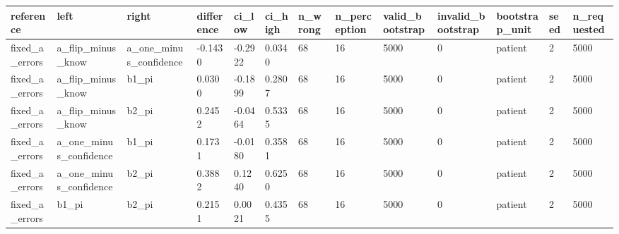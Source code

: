 \begin{tabular}{lllllllllllll}
\hline
reference & left & right & difference & ci\_low & ci\_high & n\_wrong & n\_perception & valid\_bootstrap & invalid\_bootstrap & bootstrap\_unit & seed & n\_requested \\
\hline
fixed\_a\_errors & a\_flip\_minus\_know & a\_one\_minus\_confidence & -0.1430 & -0.2922 & 0.0340 & 68 & 16 & 5000 & 0 & patient & 2 & 5000 \\
fixed\_a\_errors & a\_flip\_minus\_know & b1\_pi & 0.0300 & -0.1899 & 0.2807 & 68 & 16 & 5000 & 0 & patient & 2 & 5000 \\
fixed\_a\_errors & a\_flip\_minus\_know & b2\_pi & 0.2452 & -0.0464 & 0.5335 & 68 & 16 & 5000 & 0 & patient & 2 & 5000 \\
fixed\_a\_errors & a\_one\_minus\_confidence & b1\_pi & 0.1731 & -0.0180 & 0.3581 & 68 & 16 & 5000 & 0 & patient & 2 & 5000 \\
fixed\_a\_errors & a\_one\_minus\_confidence & b2\_pi & 0.3882 & 0.1240 & 0.6250 & 68 & 16 & 5000 & 0 & patient & 2 & 5000 \\
fixed\_a\_errors & b1\_pi & b2\_pi & 0.2151 & 0.0021 & 0.4355 & 68 & 16 & 5000 & 0 & patient & 2 & 5000 \\
\hline
\end{tabular}
